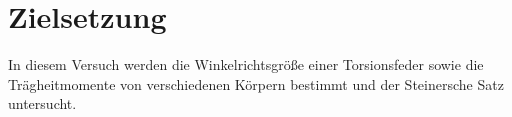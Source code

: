 \section{Zielsetzung}
\label{sec:Zielsetzung}
In diesem Versuch werden die Winkelrichtsgröße einer Torsionsfeder sowie die
Trägheitmomente von verschiedenen Körpern bestimmt und der Steinersche Satz
untersucht.
